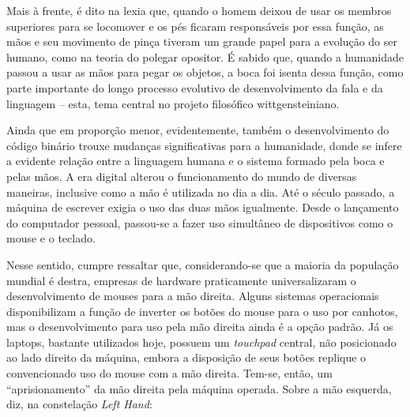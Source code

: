 \documentclass[portuguese]{textolivre}
\begin{document}
Mais à frente, é dito na lexia que, quando o homem deixou de usar os membros superiores para se locomover e os pés ficaram responsáveis por essa função, as mãos e seu movimento de pinça tiveram um grande papel para a evolução do ser humano, como na teoria do polegar opositor. É sabido que, quando a humanidade passou a usar as mãos para pegar os objetos, a boca foi isenta dessa função, como parte importante do longo processo evolutivo de desenvolvimento da fala e da linguagem – esta, tema central no projeto filosófico wittgensteiniano.  

Ainda que em proporção menor, evidentemente, também o desenvolvimento do código binário trouxe mudanças significativas para a humanidade, donde se infere a evidente relação entre a linguagem humana e o sistema formado pela boca e pelas mãos.  A era digital alterou o funcionamento do mundo de diversas maneiras, inclusive como a mão é utilizada no dia a dia. Até o século passado, a máquina de escrever exigia o uso das duas mãos igualmente. Desde o lançamento do computador pessoal, passou-se a fazer uso simultâneo de dispositivos como o mouse e o teclado. 

Nesse sentido, cumpre ressaltar que, considerando-se que a maioria da população mundial é destra, empresas de hardware praticamente universalizaram o desenvolvimento de mouses para a mão direita. Alguns sistemas operacionais disponibilizam a função de inverter os botões do mouse para o uso por canhotos, mas o desenvolvimento para uso pela mão direita ainda é a opção padrão. Já os laptops, bastante utilizados hoje, possuem um \emph{touchpad} central, não posicionado ao lado direito da máquina, embora a disposição de seus botões replique o convencionado uso do mouse com a mão direita. Tem-se, então, um “aprisionamento” da mão direita pela máquina operada. Sobre a mão esquerda, \textcite{clark2010} diz, na constelação \emph{Left Hand}: 
\end{document}
